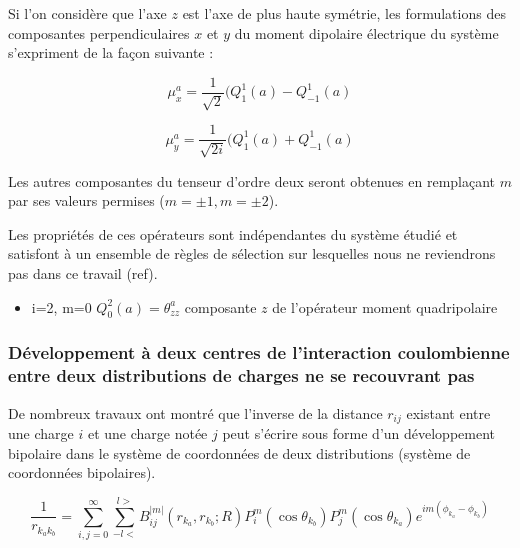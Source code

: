\documentclass[12pt,a4paper]{book}
\begin{document}
	Si l'on considère que l'axe $z$ est l'axe de plus haute symétrie, les formulations des composantes perpendiculaires $x$ et $y$ du moment dipolaire électrique du système s'expriment de la façon suivante : 
	
	\begin{equation}
	\mu_{x}^{a} = \frac{1}{\sqrt{2}} (Q_{1}^{1}(a)- Q_{-1}^{1}(a)
	\end{equation}
	
	\begin{equation}
	\mu_{y}^{a} = \frac{1}{\sqrt{2i}} (Q_{1}^{1}(a)+ Q_{-1}^{1}(a)
	\end{equation}
	
	Les autres composantes du tenseur d'ordre deux seront obtenues en remplaçant $m$ par ses valeurs permises ($m=\pm 1, m=\pm 2$).
	
	Les propriétés de ces opérateurs sont indépendantes du système étudié et satisfont à un ensemble de règles de sélection sur lesquelles nous ne reviendrons pas dans ce travail (ref). 
	
	\begin{itemize}
		\item i=2, m=0 \hspace{1cm} $Q_{0}^{2}(a) = \theta_{zz}^{a}$ \hspace{1cm} composante $z$ de l'opérateur moment quadripolaire 
	\end{itemize}
	
	\subsubsection{Développement à deux centres de l'interaction coulombienne entre deux distributions de charges ne se recouvrant pas}
	
	De nombreux travaux \cite{buehler1951bipolar,hylleraas1931elektronenterme,proctor1977long,davison1968atomic} ont montré que l'inverse de la distance $r_{ij}$ existant entre une charge $i$ et une charge notée $j$ peut s'écrire sous forme d'un développement bipolaire dans le système de coordonnées de deux distributions (système de coordonnées bipolaires).
	
	\begin{equation}
	\frac{1}{r_{k_{a}k_{b}}} = \sum_{i,j=0}^{\infty} \sum_{-l<}^{l>} B_{ij}^{|m|}(r_{k_{a}}, r_{k_{b}}; R) P_{i}^{m} (\cos\theta_{k_{b}}) P_{j}^{m}(\cos\theta_{k_{a}}) e^{im(\phi_{k_{a}}-\phi_{k_{b}})}
	\end{equation}
	
\end{document}
